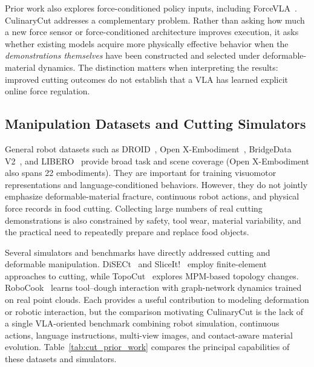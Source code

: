 Prior work also explores force-conditioned policy inputs, including ForceVLA~\citep{yu2025forcevla}. CulinaryCut addresses a complementary problem. Rather than asking how much a new force sensor or force-conditioned architecture improves execution, it asks whether existing models acquire more physically effective behavior when the \emph{demonstrations themselves} have been constructed and selected under deformable-material dynamics. The distinction matters when interpreting the results: improved cutting outcomes do not establish that a VLA has learned explicit online force regulation.

\subsection{Manipulation Datasets and Cutting Simulators}
\label{subsec:cut_related_datasets}

General robot datasets such as DROID~\citep{khazatsky2025droidlargescaleinthewildrobot}, Open X-Embodiment~\citep{o2024open}, BridgeData V2~\citep{bridgedata2023}, and LIBERO~\citep{libero2023} provide broad task and scene coverage (Open X-Embodiment also spans 22 embodiments). They are important for training visuomotor representations and language-conditioned behaviors. However, they do not jointly emphasize deformable-material fracture, continuous robot actions, and physical force records in food cutting. Collecting large numbers of real cutting demonstrations is also constrained by safety, tool wear, material variability, and the practical need to repeatedly prepare and replace food objects.

Several simulators and benchmarks have directly addressed cutting and deformable manipulation. DiSECt~\citep{disect2022} and SliceIt!~\citep{sliceit2024} employ finite-element approaches to cutting, while TopoCut~\citep{topocut2025} explores MPM-based topology changes. RoboCook~\citep{shi2023robocook} learns tool--dough interaction with graph-network dynamics trained on real point clouds. Each provides a useful contribution to modeling deformation or robotic interaction, but the comparison motivating CulinaryCut is the lack of a single VLA-oriented benchmark combining robot simulation, continuous actions, language instructions, multi-view images, and contact-aware material evolution. Table~\ref{tab:cut_prior_work} compares the principal capabilities of these datasets and simulators.

